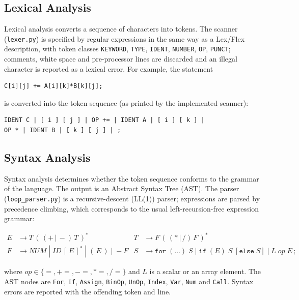 \subsection{Lexical Analysis}

Lexical analysis converts a sequence of characters into tokens. The scanner
(\texttt{lexer.py}) is specified by regular expressions in the same way as a
Lex/Flex description, with token classes \texttt{KEYWORD}, \texttt{TYPE},
\texttt{IDENT}, \texttt{NUMBER}, \texttt{OP}, \texttt{PUNCT}; comments,
white space and pre-processor lines are discarded and an illegal character is
reported as a lexical error. For example, the statement

\begin{verbatim}
C[i][j] += A[i][k]*B[k][j];
\end{verbatim}

is converted into the token sequence (as printed by the implemented scanner):

\begin{verbatim}
IDENT C | [ i ] [ j ] | OP += | IDENT A | [ i ] [ k ] |
OP * | IDENT B | [ k ] [ j ] | ;
\end{verbatim}

\subsection{Syntax Analysis}

Syntax analysis determines whether the token sequence conforms to the grammar
of the language. The output is an Abstract Syntax Tree (AST). The parser
(\texttt{loop\_parser.py}) is a recursive-descent (LL(1)) parser; expressions are
parsed by precedence climbing, which corresponds to the usual left-recursion-free
expression grammar:

\begin{align*}
E &\rightarrow T\,(\,(+\,|\,-)\,T\,)^{*} &
T &\rightarrow F\,(\,(*\,|\,/)\,F\,)^{*} \\
F &\rightarrow \mathit{NUM}\;|\;\mathit{ID}\,[\,E\,]^{*}\;|\;(\,E\,)\;|\;-F &
S &\rightarrow \texttt{for}\;(\dots)\;S\;|\;\texttt{if}\;(E)\;S\;[\texttt{else}\;S]\;|\;L\;\mathit{op}\;E\,;
\end{align*}

where $\mathit{op}\in\{=,+\!=,-\!=,*\!=,/\!=\}$ and $L$ is a scalar or an array element.
The AST nodes are \texttt{For}, \texttt{If}, \texttt{Assign}, \texttt{BinOp},
\texttt{UnOp}, \texttt{Index}, \texttt{Var}, \texttt{Num} and \texttt{Call}.
Syntax errors are reported with the offending token and line.

